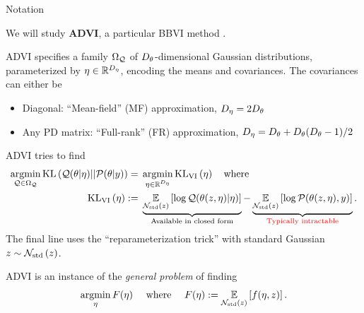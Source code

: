 \documentclass[8pt]{beamer}\usepackage[]{graphicx}\usepackage[]{color}
\begin{document}
\begin{frame}[t]{Notation}
%


We will study \textbf{ADVI}, a particular BBVI method
\citep{kucukelbir:2017:advi}.

ADVI specifies a family $\Omega_{\mathcal{Q}}$ of ${D_{\theta}}$-dimensional Gaussian
distributions, parameterized by $\eta \in \mathbb{R}^{D_{\eta}}$, encoding the means and
covariances.
%
The covariances can either be
%
\begin{itemize}
\item Diagonal: ``Mean-field'' (MF) approximation, ${D_{\eta}} = 2 {D_{\theta}}$
\item Any PD matrix: 
    ``Full-rank'' (FR) approximation, 
        ${D_{\eta}} = {D_{\theta}} + {D_{\theta}}  ({D_{\theta}} - 1) / 2$
\end{itemize}
%

\pause
\hrulefill

ADVI tries to find
%
\begin{align*}
%
\argmin_{\q \in \qdom} 
\mathrm{KL}\left(\q(\theta | \eta) || \post \right) ={}&
\argmin_{\eta \in \etadom} \klfullobj{\eta} 
\quad\textrm{where }\\
\klfullobj{\eta} :={}&
\undernote{\expect{\normz}{\log \q(\theta(\z, \eta) \vert \eta)}}
{\text{Available in closed form}} -
\undernote{\expect{\normz}{\log \p(\theta(\z, \eta), \y)}}
{\red{\text{Typically intractable}}}.
%
\end{align*}
%
The final line uses the ``reparameterization trick''
with standard Gaussian $z \sim \mathcal{N}_{\mathrm{std}}\left(z\right)$. 

\pause
\hrulefill

ADVI is an instance of the \textit{general problem} of finding
%
\begin{align*}
%
\argmin_{\eta} F(\eta)
\quad\text{ where }\quad F(\eta) := \expect{\normz}{f(\eta, \z)}.
%
\end{align*}


\end{frame}


\end{document}
